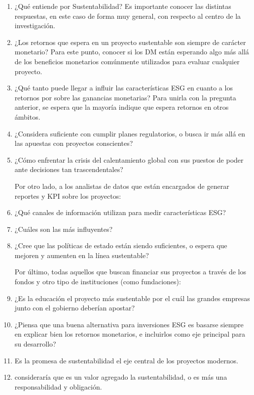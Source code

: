 \documentclass[11pt,letterpaper]{article}
\begin{document}
\begin{enumerate}
    \item ¿Qué entiende por Sustentabilidad? Es importante conocer las distintas respuestas, en este caso de forma muy general, con respecto al centro de la investigación.
    \item ¿Los retornos que espera en un proyecto sustentable son siempre de carácter monetario? Para este punto, conocer si los DM están esperando algo más allá de los beneficios monetarios comúnmente utilizados para evaluar cualquier proyecto. 
    \item ¿Qué tanto puede llegar a influir las características ESG en cuanto a los retornos por sobre las ganancias monetarias? Para unirla con la pregunta anterior, se espera que la mayoría indique que espera retornos en otros ámbitos.
    \item ¿Considera suficiente con cumplir planes regulatorios, o busca ir más allá en las apuestas con proyectos conscientes?
    \item ¿Cómo enfrentar la crisis del calentamiento global con sus puestos de poder ante decisiones tan trascendentales?
    
    
\vspace{1cm}    

Por otro lado, a los analistas de datos que están encargados de generar reportes y KPI sobre los proyectos:
    
    \item ¿Qué canales de información utilizan para medir características ESG?
    
    \item ¿Cuáles son las más influyentes?

    \item ¿Cree que las políticas de estado están siendo suficientes, o espera que mejoren y aumenten en la línea sustentable?
    
    
\vspace{1cm}


Por último, todas aquellos que buscan financiar sus proyectos a través de los fondos y otro tipo de instituciones (como fundaciones):

    \item ¿Es la educación el proyecto más sustentable por el cuál las grandes empresas junto con el gobierno deberían apostar?
    \item ¿Piensa que una buena alternativa para inversiones ESG es basarse siempre en explicar bien los retornos monetarios, e incluirlos como eje principal para su desarrollo?
    \item Es la promesa de sustentabilidad el eje central de los proyectos modernos.
    \item consideraría que es un valor agregado la sustentabilidad, o es más una responsabilidad y obligación.
    

\end{enumerate}
\end{document}
